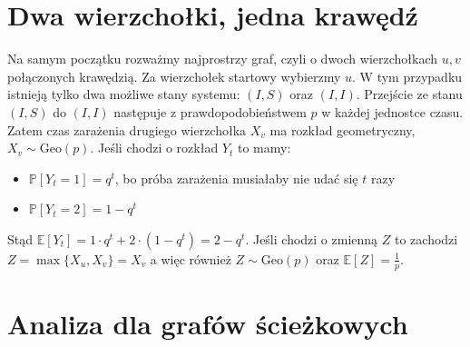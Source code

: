 \section{Dwa wierzchołki, jedna krawędź}

Na samym początku rozważmy najprostrzy graf, czyli o dwoch wierzchołkach $u,v$ połączonych krawędzią. Za wierzchołek startowy wybierzmy $u$. W tym przypadku istnieją tylko dwa możliwe stany systemu: $(I,S)$ oraz $(I,I)$. Przejście ze stanu $(I, S)$ do $(I, I)$ następuje z prawdopodobieństwem $p$ w każdej jednostce czasu. Zatem czas zarażenia drugiego wierzchołka $X_v$ ma rozkład geometryczny, $X_v \sim \mathrm{Geo}(p)$. Jeśli chodzi o rozkład $Y_t$ to mamy:
\begin{itemize}
    \item $\mathbb{P}[Y_t=1]=q^t$, bo próba zarażenia musiałaby nie udać się $t$ razy
    \item $\mathbb{P}[Y_t=2]=1-q^t$
\end{itemize}
Stąd $\mathbb{E}[Y_t]=1\cdot q^t + 2 \cdot (1-q^t) = 2-q^t$. Jeśli chodzi o zmienną $Z$ to zachodzi $Z=\max\{X_u,X_v\}=X_v$ a więc również $Z\sim \mathrm{Geo}(p)$ oraz $\mathbb{E}[Z]=\frac{1}{p}$.


\section{Analiza dla grafów ścieżkowych}

